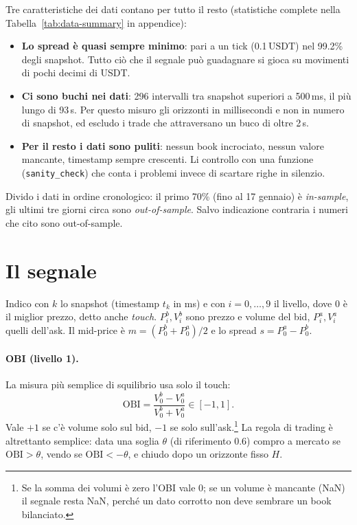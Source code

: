 \documentclass[a4paper,11pt]{article}
\newcommand{\OBI}{\mathrm{OBI}}
\newcommand{\usdt}{\ensuremath{\,\mathrm{USDT}}}
\newcommand{\code}[1]{\texttt{#1}}
\begin{document}
Tre caratteristiche dei dati contano per tutto il resto (statistiche complete nella
Tabella~\ref{tab:data-summary} in appendice):
\begin{itemize}[leftmargin=*]
  \item \textbf{Lo spread è quasi sempre minimo}: pari a un tick (0.1\usdt{}) nel 99.2\% degli
        snapshot. Tutto ciò che il segnale può guadagnare si gioca su movimenti di pochi decimi
        di USDT.
  \item \textbf{Ci sono buchi nei dati}: 296 intervalli tra snapshot superiori a 500\,ms, il più
        lungo di 93\,s. Per questo misuro gli orizzonti in millisecondi e non in numero di
        snapshot, ed escludo i trade che attraversano un buco di oltre 2\,s.
  \item \textbf{Per il resto i dati sono puliti}: nessun book incrociato, nessun valore mancante,
        timestamp sempre crescenti. Li controllo con una funzione (\code{sanity\_check}) che
        conta i problemi invece di scartare righe in silenzio.
\end{itemize}

Divido i dati in ordine cronologico: il primo 70\% (fino al 17 gennaio) è
\emph{in-sample}, gli ultimi tre giorni circa sono \emph{out-of-sample}. Salvo indicazione
contraria i numeri che cito sono out-of-sample.

\section{Il segnale}
\label{sec:segnale}

Indico con $k$ lo snapshot (timestamp $t_k$ in ms) e con $i=0,\dots,9$ il livello, dove $0$ è
il miglior prezzo, detto anche \emph{touch}. $P^b_i, V^b_i$ sono prezzo e volume del bid,
$P^a_i, V^a_i$ quelli dell'ask. Il mid-price è $m = (P^b_0 + P^a_0)/2$ e lo spread
$s = P^a_0 - P^b_0$.

\paragraph{OBI (livello 1).} La misura più semplice di squilibrio usa solo il touch:
\begin{equation}
  \OBI = \frac{V^b_0 - V^a_0}{V^b_0 + V^a_0} \in [-1, 1].
  \label{eq:obi}
\end{equation}
Vale $+1$ se c'è volume solo sul bid, $-1$ se solo sull'ask.\footnote{Se la somma dei volumi è
zero l'OBI vale 0; se un volume è mancante (NaN) il segnale resta NaN, perché un dato corrotto
non deve sembrare un book bilanciato.} La regola di trading è altrettanto semplice: data una
soglia $\theta$ (di riferimento $0.6$) compro a mercato se $\OBI > \theta$, vendo se
$\OBI < -\theta$, e chiudo dopo un orizzonte fisso $H$.
\end{document}

